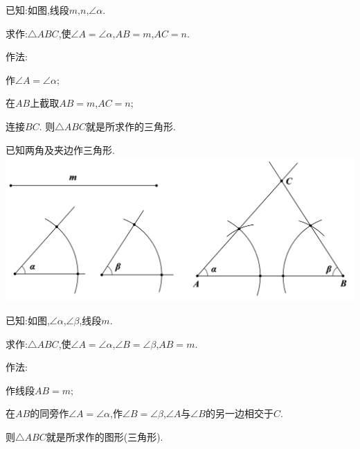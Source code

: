 \documentclass[cn,blue,12pt]{elegantbook}
\begin{document}
\begin{zsyd}
\begin{zsyd}
        \begin{zsyd}
        \item 已知:如图,线段\(m\),\(n\),\(\angle \alpha .\)
        \item 求作:\( \triangle ABC\),使\( \angle A= \angle \alpha \),\(AB=m\),\(AC=n\).
        \item 作法:
            \begin{zsyd}
            \item 作\( \angle A= \angle \alpha \);
            \item 在\(AB\)上截取\(AB=m \),\(AC=n\);
            \item 连接\(BC.\)
                则\( \triangle ABC\)就是所求作的三角形.
            \end{zsyd}
        \end{zsyd}
    \item 已知两角及夹边作三角形.\\
        \includegraphics[width=0.8\linewidth]{pic/20200515013.png}\\
        \begin{zsyd}
        \item 已知:如图,\( \angle \alpha \),\( \angle \beta \),线段\(m .	\)
        \item 求作:\( \triangle ABC\),使\( \angle A= \angle \alpha \),\( \angle B= \angle \beta \),\(AB=m. \)
        \item 作法:
            \begin{zsyd}
            \item 作线段\(AB=m\);
            \item 在\(AB\)的同旁作\( \angle A= \angle \alpha \),作\( \angle B= \angle \beta \),\(\angle A\)与\( \angle B\)的另一边相交于\(C.\)
            \item 则\( \triangle ABC\)就是所求作的图形(三角形).
            \end{zsyd}
        \end{zsyd}
    \end{zsyd}


\end{zsyd}
\end{document}
